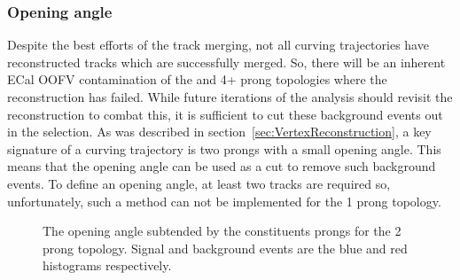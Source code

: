 \subsubsection{Opening angle}
\label{subsubsec:OpeningAngle}
Despite the best efforts of the track merging, not all curving trajectories have reconstructed tracks which are successfully merged.  So, there will be an inherent ECal OOFV contamination of the  and 4+ prong topologies where the reconstruction has failed.  While future iterations of the analysis should revisit the reconstruction to combat this, it is sufficient to cut these background events out in the selection.  As was described in section~\ref{sec:VertexReconstruction}, a key signature of a curving trajectory is two prongs with a small opening angle.  This means that the opening angle can be used as a cut to remove such background events.  To define an opening angle, at least two tracks are required so, unfortunately, such a method can not be implemented for the 1 prong topology.
\newline
\newline
\begin{figure}[b!]
  \centering
  \caption{The opening angle subtended by the constituents prongs for the 2 prong topology.  Signal and background events are the blue and red histograms respectively.}
  \label{fig:Sel2OpeningAngle}
\end{figure}
